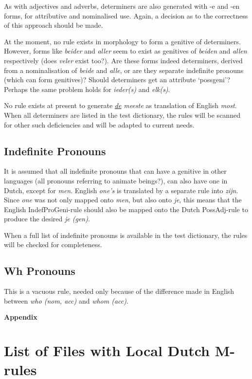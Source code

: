 As with adjectives and adverbs, determiners are also generated with -e and -en 
forms, for attributive and nominalised use. Again, a decision as to the 
correctness of this approach should be made.

At the moment, no rule exists in morphology to form a genitive of determiners. 
However, forms like {\em beider\/} and {\em aller\/} seem to exist as genitives 
of {\em beiden\/} and {\em allen\/} respectively (does 
{\em veler\/} exist too?). Are these forms indeed determiners, derived from a 
nominalisation of {\em beide\/} and {\em alle\/}, or are they separate
indefinite pronouns (which can form genitives)? Should determiners get an 
attribute `possgeni'? Perhaps the same problem holds for {\em ieder(s)\/} and 
{\em elk(s)\/}. 

No rule exists at present to generate {\em \underline{de} meeste\/} as 
translation of English {\em most\/}. When all determiners are listed in the 
test dictionary, the rules will be scanned for other such deficiencies and 
will be adapted to current needs.

\subsection{Indefinite Pronouns}

It is assumed that all indefinite pronouns that can have a genitive in other 
languages (all pronouns referring to animate beings?), can also have one in 
Dutch, except for {\em men\/}. English 
{\em one's\/} is translated by a separate rule into {\em zijn\/}. Since 
{\em one\/} was not only mapped onto {\em men\/}, but also onto {\em je\/}, 
this means that the English IndefProGeni-rule should also be mapped onto the 
Dutch PossAdj-rule to produce the desired {\em je (gen)\/}.

When a full list of indefinite pronouns is available in the test dictionary, 
the rules will be checked for completeness.

\subsection{Wh Pronouns}

This is a vacuous rule, needed only because of the difference made in English 
between {\em who (nom, acc)\/} and {\em whom (acc)\/}.



\newpage
{\Large\bf Appendix}
\appendix
\section{List of Files with Local Dutch M-rules}

